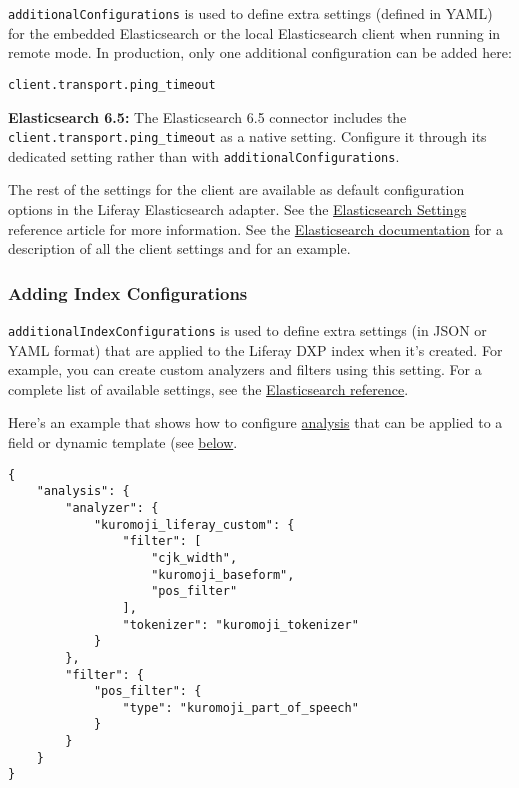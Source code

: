 \texttt{additionalConfigurations} is used to define extra settings
(defined in YAML) for the embedded Elasticsearch or the local
Elasticsearch client when running in remote mode. In production, only
one additional configuration can be added here:

\begin{verbatim}
client.transport.ping_timeout
\end{verbatim}

\noindent\hrulefill

\textbf{Elasticsearch 6.5:} The Elasticsearch 6.5 connector includes the
\texttt{client.transport.ping\_timeout} as a native setting. Configure
it through its dedicated setting rather than with
\texttt{additionalConfigurations}.

\noindent\hrulefill

The rest of the settings for the client are available as default
configuration options in the Liferay Elasticsearch adapter. See the
\href{/docs/7-0/deploy/-/knowledge_base/d/elasticsearch-settings}{Elasticsearch
Settings} reference article for more information. See the
\href{https://www.elastic.co/guide/en/elasticsearch/client/java-api/2.4/transport-client.html}{Elasticsearch
documentation} for a description of all the client settings and for an
example.

\subsubsection{Adding Index
Configurations}\label{adding-index-configurations}

\texttt{additionalIndexConfigurations} is used to define extra settings
(in JSON or YAML format) that are applied to the Liferay DXP index when
it's created. For example, you can create custom analyzers and filters
using this setting. For a complete list of available settings, see the
\href{https://www.elastic.co/guide/en/elasticsearch/reference/2.4/index-modules.html}{Elasticsearch
reference}.

Here's an example that shows how to configure
\href{https://www.elastic.co/guide/en/elasticsearch/guide/current/analysis-intro.html\#analysis-intro}{analysis}
that can be applied to a field or dynamic template (see
\hyperref[overriding-type-mappings]{below}.

\begin{verbatim}
{  
    "analysis": {
        "analyzer": {
            "kuromoji_liferay_custom": {
                "filter": [
                    "cjk_width",
                    "kuromoji_baseform",
                    "pos_filter"
                ],
                "tokenizer": "kuromoji_tokenizer"
            }
        },
        "filter": {
            "pos_filter": {
                "type": "kuromoji_part_of_speech"
            }
        }
    }
}
\end{verbatim}

